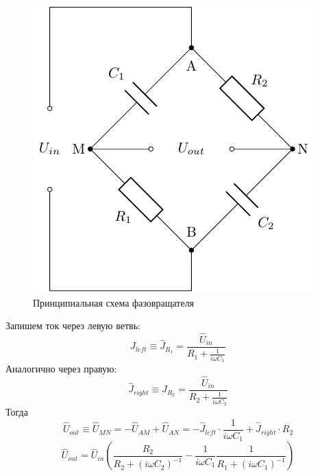 \begin{figure}[H]
	\centering
	\includegraphics[]{chems/chem5}
	\caption{Принципиальная схема фазовращателя}
	\label{fig:ph_rot}
\end{figure}

Запишем ток через левую ветвь:
\begin{equation}
	\hat{J}_{left}\equiv \hat{J}_{R_1}=\frac{\hat{U}_{in}}{R_1+\frac{1}{i\omega C_1}}
\end{equation}
Аналогично через правую:
\begin{equation}
	\hat{J}_{right}\equiv \hat{J}_{R_2}=\frac{\hat{U}_{in}}{R_2+\frac{1}{i\omega C_2}}
\end{equation}
Тогда
\begin{equation}
	\hat{U}_{out}\equiv\hat{U}_{MN}=
	-\hat{U}_{AM}+\hat{U}_{AN}=
	-\hat{J}_{left}\cdot\frac{1}{i\omega C_1}
	+\hat{J}_{right}\cdot R_2
\end{equation}
\begin{equation}
	\hat{U}_{out}=\hat{U}_{in}
	\left(
	\frac{R_2}{R_2+(i\omega C_2)^{-1}}-
	\frac{1}{i\omega C_1}\frac{1}{R_1+(i\omega C_1)^{-1}}
	\right)
\end{equation}

